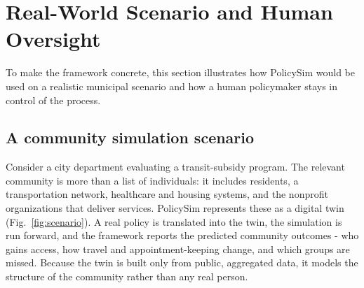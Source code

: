 \documentclass[conference]{IEEEtran}
\begin{document}
\section{Real-World Scenario and Human Oversight}
\label{sec:scenario}

To make the framework concrete, this section illustrates how PolicySim would be used on a realistic municipal scenario and how a human policymaker stays in control of the process.

\subsection{A community simulation scenario}
Consider a city department evaluating a transit-subsidy program. The relevant community is more than a list of individuals: it includes residents, a transportation network, healthcare and housing systems, and the nonprofit organizations that deliver services. PolicySim represents these as a digital twin (Fig.~\ref{fig:scenario}). A real policy is translated into the twin, the simulation is run forward, and the framework reports the predicted community outcomes - who gains access, how travel and appointment-keeping change, and which groups are missed. Because the twin is built only from public, aggregated data, it models the structure of the community rather than any real person.
\end{document}
